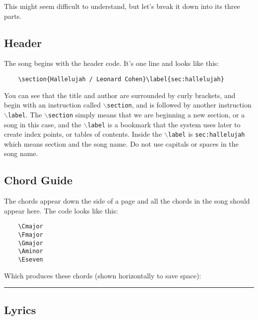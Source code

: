 \documentclass[10pt,a4paper,oneside]{book}
\newcommand{\Cmajor}{\marginpar{\chord{t}{o,o,o,3}{C}}}
\newcommand{\Fmajor}{\marginpar{\chord{t}{4,3,2,2}{F}}}
\newcommand{\Gmajor}{\marginpar{\chord{t}{o,2,3,2}{G}}}
\newcommand{\Aminor}{\marginpar{\chord{t}{2,o,o,o}{A\large{m}}}}
\newcommand{\Eseven}{\marginpar{\chord{t}{1,2,o,2}{E\large{7}}}}
\begin{document}
This might seem difficult to understand, but let's break it down into its three parts.


\subsection{Header} %
\label{sub:header}

The song begins with the header code. It's one line and looks like this:

\begin{verbatim}
	\section{Hallelujah / Leonard Cohen}\label{sec:hallelujah}
\end{verbatim}

You can see that the title and author are surrounded by curly brackets, and begin with an instruction called \texttt{$\backslash$section}, and is followed by another instruction \texttt{$\backslash$label}. The \texttt{$\backslash$section} simply means that we are beginning a new section, or a song in this case, and the \texttt{$\backslash$label} is a bookmark that the system uses later to create index points, or tables of contents. Inside the \texttt{$\backslash$label} is \texttt{sec:hallelujah} which means section and the song name. Do not use capitals or spaces in the song name.


\subsection{Chord Guide} %
\label{sub:chord_guide}
	
The chords appear down the side of a page and all the chords in the song should appear here. The code looks like this:

\begin{verbatim}
	\Cmajor
	\Fmajor
	\Gmajor
	\Aminor
	\Eseven
\end{verbatim}

Which produces these chords (shown horizontally to save space):\\
\hrule
\hfill {}
\hfill {}
\hfill {}
\hfill {}
\hfill {}


\subsection{Lyrics} %
\label{sub:lyrics}
\end{document}
